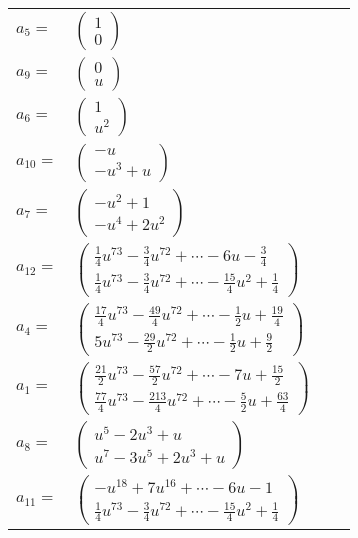 \documentclass[1p]{elsarticle_modified}
\theoremstyle{definition}
\begin{document}
\begin{tabular}{m{7pt} m{180pt} m{7pt} m{180pt} }
\flushright $a_{5}=$&$\begin{pmatrix}1\\0\end{pmatrix}$ \\
\flushright $a_{9}=$&$\begin{pmatrix}0\\u\end{pmatrix}$ \\
\flushright $a_{6}=$&$\begin{pmatrix}1\\u^2\end{pmatrix}$ \\
\flushright $a_{10}=$&$\begin{pmatrix}- u\\- u^3+u\end{pmatrix}$ \\
\flushright $a_{7}=$&$\begin{pmatrix}- u^2+1\\- u^4+2 u^2\end{pmatrix}$ \\
\flushright $a_{12}=$&$\begin{pmatrix}\frac{1}{4} u^{73}-\frac{3}{4} u^{72}+\cdots-6 u-\frac{3}{4}\\\frac{1}{4} u^{73}-\frac{3}{4} u^{72}+\cdots-\frac{15}{4} u^2+\frac{1}{4}\end{pmatrix}$ \\
\flushright $a_{4}=$&$\begin{pmatrix}\frac{17}{4} u^{73}-\frac{49}{4} u^{72}+\cdots-\frac{1}{2} u+\frac{19}{4}\\5 u^{73}-\frac{29}{2} u^{72}+\cdots-\frac{1}{2} u+\frac{9}{2}\end{pmatrix}$ \\
\flushright $a_{1}=$&$\begin{pmatrix}\frac{21}{2} u^{73}-\frac{57}{2} u^{72}+\cdots-7 u+\frac{15}{2}\\\frac{77}{4} u^{73}-\frac{213}{4} u^{72}+\cdots-\frac{5}{2} u+\frac{63}{4}\end{pmatrix}$ \\
\flushright $a_{8}=$&$\begin{pmatrix}u^5-2 u^3+u\\u^7-3 u^5+2 u^3+u\end{pmatrix}$ \\
\flushright $a_{11}=$&$\begin{pmatrix}- u^{18}+7 u^{16}+\cdots-6 u-1\\\frac{1}{4} u^{73}-\frac{3}{4} u^{72}+\cdots-\frac{15}{4} u^2+\frac{1}{4}\end{pmatrix}$ \\

\end{tabular}
\end{document}
